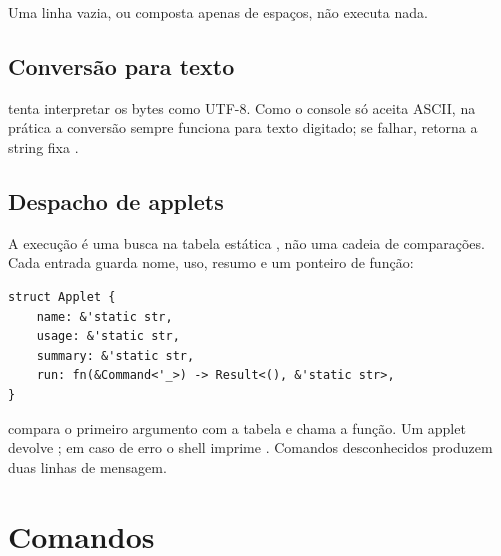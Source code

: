 Uma linha vazia, ou composta apenas de espa\c{c}os, n\~ao executa nada.

\subsection{Convers\~ao para texto}

 tenta interpretar os bytes como UTF-8. Como o console s\'o
aceita ASCII, na pr\'atica a convers\~ao sempre funciona para texto digitado;
se falhar, retorna a string fixa .

\subsection{Despacho de applets}

A execu\c{c}\~ao \'e uma busca na tabela est\'atica , n\~ao uma
cadeia de compara\c{c}\~oes. Cada entrada guarda nome, uso, resumo e um
ponteiro de fun\c{c}\~ao:

\begin{lstlisting}[caption={Entrada da tabela de applets.},label={lst:applet}]
struct Applet {
    name: &'static str,
    usage: &'static str,
    summary: &'static str,
    run: fn(&Command<'_>) -> Result<(), &'static str>,
}
\end{lstlisting}

 compara o primeiro argumento com a tabela e
 chama a fun\c{c}\~ao. Um applet devolve ; em caso
de erro o shell imprime . Comandos desconhecidos produzem
duas linhas de mensagem.

\section{Comandos}

